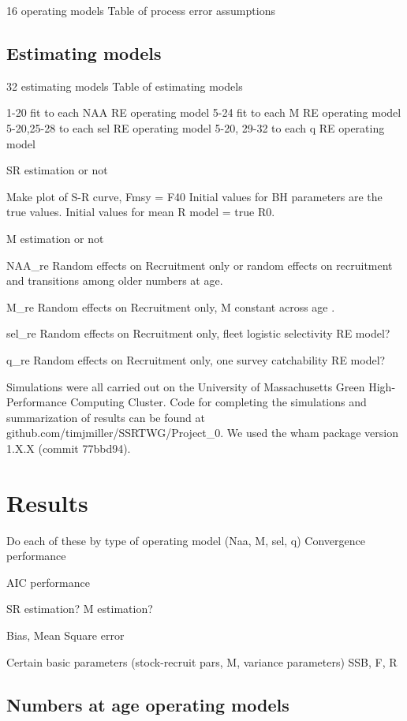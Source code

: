 \documentclass[
  12pt,
]{article}
\begin{document}
16 operating models Table of process error assumptions

\hypertarget{estimating-models}{%
\subsection{Estimating models}\label{estimating-models}}

32 estimating models Table of estimating models

1-20 fit to each NAA RE operating model 5-24 fit to each M RE operating
model 5-20,25-28 to each sel RE operating model 5-20, 29-32 to each q RE
operating model

SR estimation or not

Make plot of S-R curve, Fmsy = F40 Initial values for BH parameters are
the true values. Initial values for mean R model = true R0.

M estimation or not

NAA\_re Random effects on Recruitment only or random effects on
recruitment and transitions among older numbers at age.

M\_re Random effects on Recruitment only, M constant across age .

sel\_re Random effects on Recruitment only, fleet logistic selectivity
RE model?

q\_re Random effects on Recruitment only, one survey catchability RE
model?

Simulations were all carried out on the University of Massachusetts
Green High-Performance Computing Cluster. Code for completing the
simulations and summarization of results can be found at
github.com/timjmiller/SSRTWG/Project\_0. We used the wham package
version 1.X.X (commit 77bbd94).

\hypertarget{results}{%
\section{Results}\label{results}}

Do each of these by type of operating model (Naa, M, sel, q) Convergence
performance

AIC performance

SR estimation? M estimation?

Bias, Mean Square error

Certain basic parameters (stock-recruit pars, M, variance parameters)
SSB, F, R

\clearpage

\hypertarget{numbers-at-age-operating-models}{%
\subsection{Numbers at age operating
models}\label{numbers-at-age-operating-models}}
\end{document}
